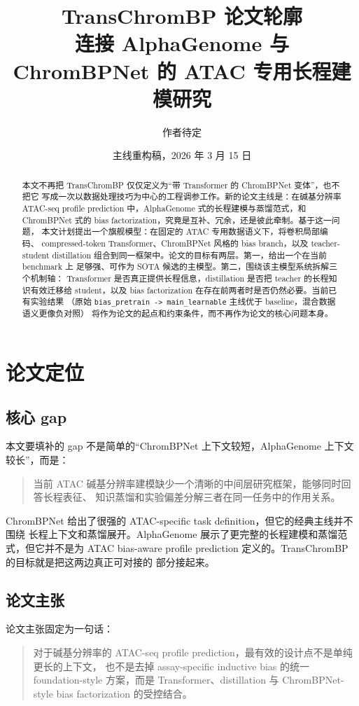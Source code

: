 \documentclass[11pt,a4paper]{ctexart}
\title{TransChromBP 论文轮廓\\
\large 连接 AlphaGenome 与 ChromBPNet 的 ATAC 专用长程建模研究}
\author{作者待定}
\date{主线重构稿，2026 年 3 月 15 日}
\begin{document}
\maketitle

\begin{abstract}
本文不再把 TransChromBP 仅仅定义为“带 Transformer 的 ChromBPNet 变体”，也不把它
写成一次以数据处理技巧为中心的工程调参工作。新的论文主线是：在碱基分辨率
ATAC-seq profile prediction 中，AlphaGenome 式的长程建模与蒸馏范式，和
ChromBPNet 式的 bias factorization，究竟是互补、冗余，还是彼此牵制。基于这一问题，
本文计划提出一个旗舰模型：在固定的 ATAC 专用数据语义下，将卷积局部编码、
compressed-token Transformer、ChromBPNet 风格的 bias branch，以及 teacher-student
distillation 组合到同一框架中。论文的目标有两层。第一，给出一个在当前 benchmark 上
足够强、可作为 SOTA 候选的主模型。第二，围绕该主模型系统拆解三个机制轴：
Transformer 是否真正提供长程信息，distillation 是否把 teacher 的长程知识有效迁移给
student，以及 bias factorization 在存在前两者时是否仍然必要。当前已有实验结果
（原始 \texttt{bias\_pretrain -> main\_learnable} 主线优于 baseline，混合数据语义更像负对照）
将作为论文的起点和约束条件，而不再作为论文的核心问题本身。
\end{abstract}

\tableofcontents

\section{论文定位}

\subsection{核心 gap}
本文要填补的 gap 不是简单的“ChromBPNet 上下文较短，AlphaGenome 上下文较长”，而是：
\begin{quote}
当前 ATAC 碱基分辨率建模缺少一个清晰的中间层研究框架，能够同时回答长程表征、
知识蒸馏和实验偏差分解三者在同一任务中的作用关系。
\end{quote}

ChromBPNet 给出了很强的 ATAC-specific task definition，但它的经典主线并不围绕
长程上下文和蒸馏展开。AlphaGenome 展示了更完整的长程建模和蒸馏范式，但它并不是为
ATAC bias-aware profile prediction 定义的。TransChromBP 的目标就是把这两边真正可对接的
部分接起来。

\subsection{论文主张}
论文主张固定为一句话：
\begin{quote}
对于碱基分辨率的 ATAC-seq profile prediction，最有效的设计点不是单纯更长的上下文，
也不是去掉 assay-specific inductive bias 的统一 foundation-style 方案，而是
Transformer、distillation 与 ChromBPNet-style bias factorization 的受控结合。
\end{quote}
\end{document}
